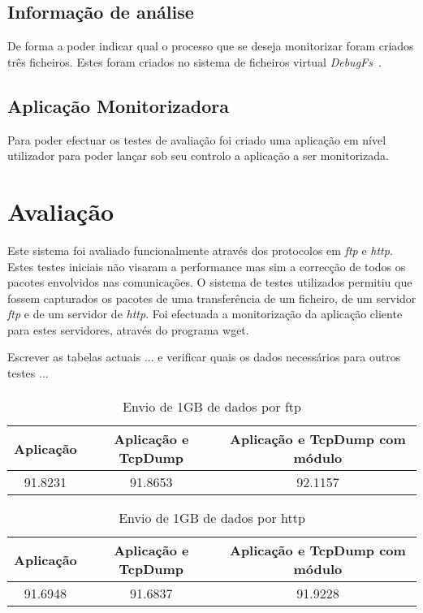 \documentclass[a4paper]{llncs}
\begin{document}
\subsection*{Informação de análise}
\label{sub:data_information}

De forma a poder indicar qual o processo que se deseja monitorizar foram criados três ficheiros. Estes foram criados no sistema de ficheiros virtual \textit{DebugFs}~\cite{DebugFs}.

\subsection{Aplicação Monitorizadora}
\label{sub:monitor_app}
Para poder efectuar os testes de avaliação foi criado uma aplicação em nível utilizador para poder lançar sob seu controlo a aplicação a ser monitorizada.

\section{Avaliação}
\label{sec:evaluation}
Este sistema foi avaliado funcionalmente através dos protocolos em \textit{ftp} e \textit{http}. Estes testes iniciais não visaram a performance mas sim a correcção de todos os pacotes envolvidos nas comunicações.
O sistema de testes utilizados permitiu que fossem capturados os pacotes de uma transferência de um ficheiro, de um servidor \textit{ftp} e de um servidor de \textit{http}. Foi efectuada a monitorização da aplicação cliente para estes servidores, através do programa wget.

Escrever as tabelas actuais ... e verificar quais os dados necessários para outros testes ...
\paragraph*{}

\begin{table}
\caption{Envio de 1GB de dados por ftp}
\begin{tabular}{| c | c | c |}
\hline
\hspace {1cm} Aplicação \hspace {1cm} & Aplicação e TcpDump & Aplicação e TcpDump com módulo \\
\hline
91.8231 & 91.8653 & 92.1157 \\
\hline
\end{tabular}
\end{table}

\begin{center}
\begin{table}
\caption{Envio de 1GB de dados por http}
\begin{tabular}{ | c | c | c  | }
\hline
\hspace {1cm} Aplicação \hspace {1cm} & Aplicação e TcpDump & Aplicação e TcpDump com módulo \\
\hline
91.6948 & 91.6837 & 91.9228 \\
\hline
\end{tabular}
\end{table}
\end{center}
\end{document}

